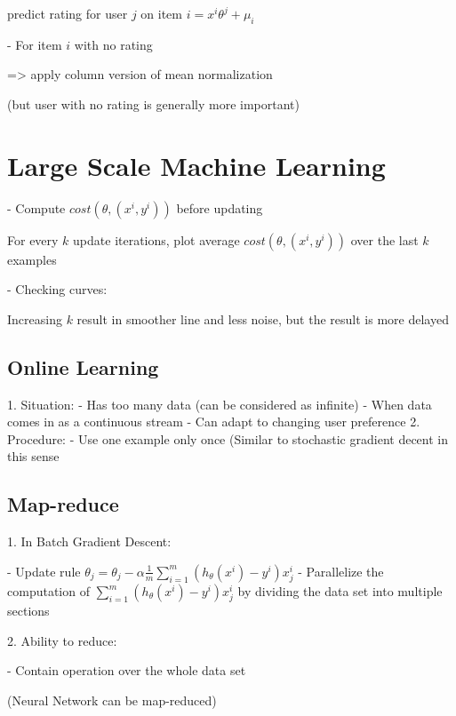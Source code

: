 	predict rating for user $j$ on item $i = x^i\theta^j + \mu_i$ 

- For item $i$ with no rating

=> apply column version of mean normalization

(but user with no rating is generally more important)

\section{Large Scale Machine Learning}

- Compute $cost(\theta,(x^i,y^i))$ before updating 

For every $k$ update iterations, plot average $cost(\theta,(x^i,y^i))$ over the last $k$ examples

- Checking curves:

Increasing $k$ result in smoother line and less noise, but the result is more delayed

\subsection{Online Learning}

1. Situation:
- Has too many data (can be considered as infinite)
- When data comes in as a continuous stream
- Can adapt to changing user preference
2. Procedure:
- Use one example only once (Similar to stochastic gradient decent in this sense

\subsection{Map-reduce}

1. In Batch Gradient Descent:

- Update rule $\displaystyle \theta_j = \theta_j - \alpha \frac 1 m \sum^m_{i=1} (h_\theta(x^i)-y^i)x_j^i$ 
- Parallelize the computation of $\displaystyle \sum^m_{i=1} (h_\theta(x^i)-y^i)x_j^i$ by dividing the data set into multiple sections

2. Ability to reduce:

- Contain operation over the whole data set

(Neural Network can be map-reduced)









